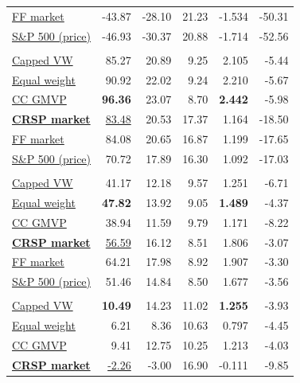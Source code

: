 \documentclass[letterpaper,journal]{IEEEtran}
\begin{document}
\begin{table}[!tp]
\begin{minipage}[t]{0.485\textwidth}
\begin{tabular}[t]{@{}lrrrrr@{}}
\hyperref[alloc:FF_market]{FF market} & -43.87 & -28.10 & 21.23 & -1.534 & -50.31 \\
\hyperref[alloc:SP500]{S\&P 500 (price)} & -46.93 & -30.37 & 20.88 & -1.714 & -52.56 \\
\addlinespace[4pt]
\multicolumn{6}{@{}l}{\textit{Recovery I}}\\[1pt]
\hyperref[alloc:source_weight]{Capped VW} & 85.27 & 20.89 & 9.25 & 2.105 & -5.44 \\
\hyperref[alloc:equal_weight]{Equal weight} & 90.92 & 22.02 & 9.24 & 2.210 & -5.67 \\
\hyperref[alloc:gmvp_constant_corr]{CC GMVP} & \textbf{96.36} & 23.07 & 8.70 & \textbf{2.442} & -5.98 \\
\textbf{\hyperref[alloc:CRSP_market]{CRSP market}} & \underline{83.48} & 20.53 & 17.37 & 1.164 & -18.50 \\
\hyperref[alloc:FF_market]{FF market} & 84.08 & 20.65 & 16.87 & 1.199 & -17.65 \\
\hyperref[alloc:SP500]{S\&P 500 (price)} & 70.72 & 17.89 & 16.30 & 1.092 & -17.03 \\
\addlinespace[4pt]
\multicolumn{6}{@{}l}{\textit{Bull II}}\\[1pt]
\hyperref[alloc:source_weight]{Capped VW} & 41.17 & 12.18 & 9.57 & 1.251 & -6.71 \\
\hyperref[alloc:equal_weight]{Equal weight} & \textbf{47.82} & 13.92 & 9.05 & \textbf{1.489} & -4.37 \\
\hyperref[alloc:gmvp_constant_corr]{CC GMVP} & 38.94 & 11.59 & 9.79 & 1.171 & -8.22 \\
\textbf{\hyperref[alloc:CRSP_market]{CRSP market}} & \underline{56.59} & 16.12 & 8.51 & 1.806 & -3.07 \\
\hyperref[alloc:FF_market]{FF market} & 64.21 & 17.98 & 8.92 & 1.907 & -3.30 \\
\hyperref[alloc:SP500]{S\&P 500 (price)} & 51.46 & 14.84 & 8.50 & 1.677 & -3.56 \\
\addlinespace[4pt]
\multicolumn{6}{@{}l}{\textit{Shock I}}\\[1pt]
\hyperref[alloc:source_weight]{Capped VW} & \textbf{10.49} & 14.23 & 11.02 & \textbf{1.255} & -3.93 \\
\hyperref[alloc:equal_weight]{Equal weight} & 6.21 & 8.36 & 10.63 & 0.797 & -4.45 \\
\hyperref[alloc:gmvp_constant_corr]{CC GMVP} & 9.41 & 12.75 & 10.25 & 1.213 & -4.03 \\
\textbf{\hyperref[alloc:CRSP_market]{CRSP market}} & \underline{-2.26} & -3.00 & 16.90 & -0.111 & -9.85 \\

\end{tabular}
\end{minipage}
\end{table}
\end{document}
